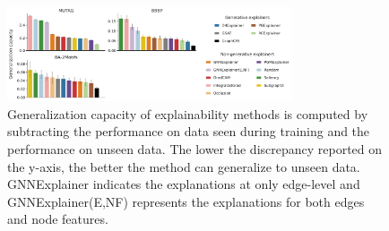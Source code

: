 \begin{table}[h]
\centering
{}
\caption{Training times (s) of the generative methods with 1 GPU (Nvidia GeForce RTX 2080)}
\label{tab:train_time}
\end{table}
\begin{figure}[h]
    \centering
    \includegraphics[width=0.75\textwidth]{submissions/Rex2023/figures/gen_capacity_3.pdf}
    \caption{Generalization capacity of explainability methods is computed by subtracting the performance on data seen during training and the performance on unseen data. The lower the discrepancy reported on the y-axis, the better the method can generalize to unseen data. GNNExplainer indicates the explanations at only edge-level and GNNExplainer(E,NF) represents the explanations for both edges and node features.}
    \label{fig:generalization}
\end{figure}

